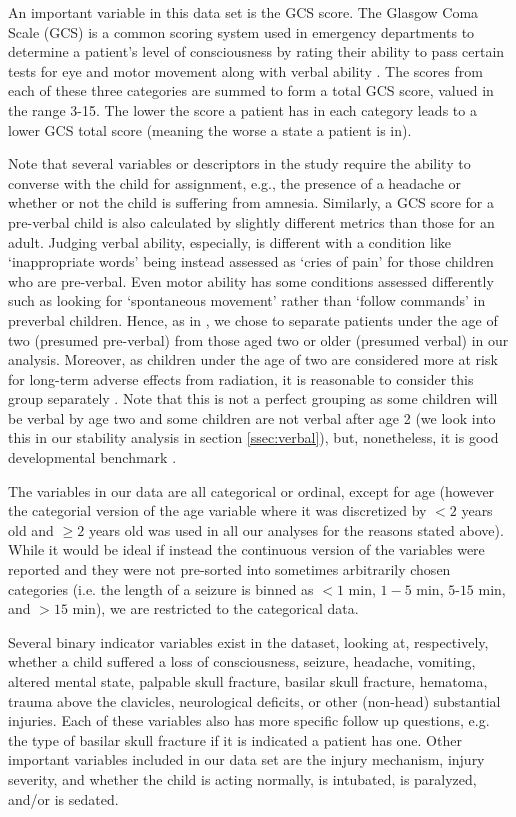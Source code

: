 \documentclass[11pt, letterpaper]{amsart}
\begin{document}
An important variable in this data set is the GCS score. The Glasgow Coma Scale (GCS) is a common scoring system used in emergency departments to determine a patient's level of consciousness by rating their ability to pass certain tests for eye and motor movement along with verbal ability \cite{teasdale2014glasgow}. The scores from each of these three categories are summed to form a total GCS score, valued in the range 3-15. The lower the score a patient has in each category leads to a lower GCS total score (meaning the worse a state a patient is in). 

Note that several variables or descriptors in the study require the ability to converse with the child for assignment, e.g., the presence of a headache or whether or not the child is suffering from amnesia. Similarly, a GCS score for a pre-verbal child is also calculated by slightly different metrics than those for an adult. Judging verbal ability, especially, is different with a condition like `inappropriate words' being instead assessed as `cries of pain' for those children who are pre-verbal. Even motor ability has some conditions assessed differently such as looking for `spontaneous movement' rather than `follow commands' in preverbal children. Hence, as in \cite{kuppermann2009identification}, we chose to separate patients under the age of two (presumed pre-verbal) from those aged two or older (presumed verbal) in our analysis. Moreover, as children under the age of two are considered more at risk for long-term adverse effects from radiation, it is reasonable to consider this group separately \cite{brenner2002estimating}. Note that this is not a perfect grouping as some children will be verbal by age two and some children are not verbal after age 2 (we look into this in our stability analysis in section \ref{ssec:verbal}), but, nonetheless, it is good developmental benchmark \cite{blackwell2007pediatric}.

The variables in our data are all categorical or ordinal, except for age (however the categorial version of the age variable where it was discretized by $< 2$ years old and $\geq 2$ years old was used in all our analyses for the reasons stated above). While it would be ideal if instead the continuous version of the variables were reported and they were not pre-sorted into sometimes arbitrarily chosen categories (i.e. the length of a seizure is binned as  $< 1$ min, $1 - 5$ min, $5 ‐ 15$ min, and $> 15$ min), we are restricted to the categorical data. 

Several binary indicator variables exist in the dataset, looking at, respectively, whether a child suffered a loss of consciousness, seizure, headache, vomiting, altered mental state, palpable skull fracture, basilar skull fracture, hematoma, trauma above the clavicles, neurological deficits, or other (non-head) substantial injuries. Each of these variables also has more specific follow up questions, e.g. the type of basilar skull fracture if it is indicated a patient has one. Other important variables included in our data set are the injury mechanism, injury severity, and whether the child is acting normally, is intubated, is paralyzed, and/or is sedated.
\end{document}
